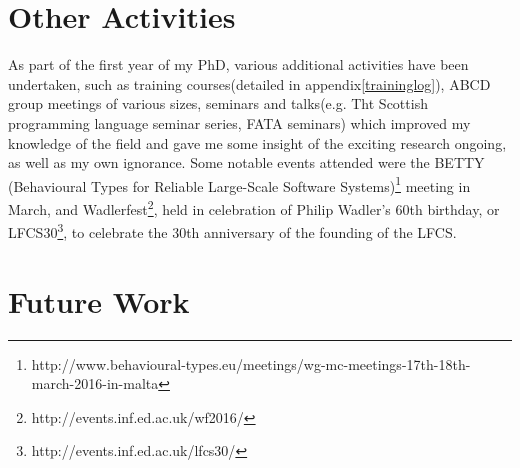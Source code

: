 

\section{Other Activities}
\label{sec:Activities}

As part of the first year of my PhD, various additional activities have been undertaken, such as training courses(detailed in appendix\ref{traininglog}), ABCD group meetings of various sizes, seminars and talks(e.g. Tht Scottish programming language seminar series, FATA seminars) which improved my knowledge of the field and gave me some insight of the exciting research ongoing, as well as my own ignorance. Some notable events attended were the BETTY (Behavioural Types for Reliable Large-Scale Software Systems)\footnote{http://www.behavioural-types.eu/meetings/wg-mc-meetings-17th-18th-march-2016-in-malta} meeting in March, and Wadlerfest\footnote{http://events.inf.ed.ac.uk/wf2016/}, held in celebration of Philip Wadler's 60th birthday, or LFCS30\footnote{http://events.inf.ed.ac.uk/lfcs30/}, to celebrate the 30th anniversary of the founding of the LFCS.


\section{Future Work}
\label{future}


